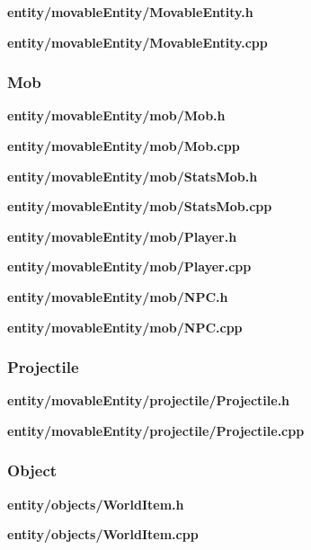 \documentclass[../Main.tex]{subfiles}
\begin{document}
            \textbf{entity/movableEntity/MovableEntity.h}
            
            \textbf{entity/movableEntity/MovableEntity.cpp}
            

        \subsubsection{Mob}
            \textbf{entity/movableEntity/mob/Mob.h}
            
            \textbf{entity/movableEntity/mob/Mob.cpp}
            

            \textbf{entity/movableEntity/mob/StatsMob.h}
            
            \textbf{entity/movableEntity/mob/StatsMob.cpp}
            

            \textbf{entity/movableEntity/mob/Player.h}
            
            \textbf{entity/movableEntity/mob/Player.cpp}
            

            \textbf{entity/movableEntity/mob/NPC.h}
            
            \textbf{entity/movableEntity/mob/NPC.cpp}
            

        \subsubsection{Projectile}
            \textbf{entity/movableEntity/projectile/Projectile.h}
            
            \textbf{entity/movableEntity/projectile/Projectile.cpp}
            

        \subsubsection{Object}
            \textbf{entity/objects/WorldItem.h}
            
            \textbf{entity/objects/WorldItem.cpp}
            
\end{document}
